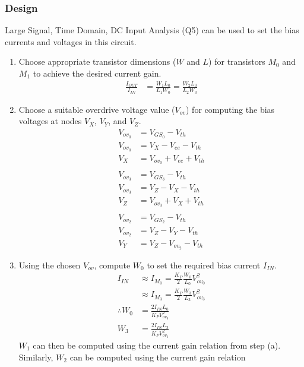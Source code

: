 \subsubsection{Design}
Large Signal, Time Domain, DC Input Analysis (Q5) can be used to set the bias
currents and voltages in this circuit.
\begin{enumerate}
  \item Choose appropriate transistor dimensions
    ($W$ and $L$) for transistors $M_0$ and $M_1$
    to achieve the desired current gain.
    \begin{align*}
      \frac{I_{OUT}}{I_{IN}} &= \frac{W_1 L_0}{L_1 W_0} = \frac{W_2 L_3}{L_2 W_3}
    \end{align*}
  \item Choose a suitable overdrive voltage value
    ($V_{ov}$) for computing the bias voltages at
    nodes $V_{X}$, $V_{Y}$, and $V_{Z}$.
    \begin{align*}
      V_{ov_0} &= V_{GS_0} - V_{th} \\
      V_{ov_0} &= V_{X} - V_{ee} - V_{th} \\
      V_{X} &= V_{ov_0} + V_{ee} + V_{th} \\
      \\
      V_{ov_3} &= V_{GS_3} - V_{th} \\
      V_{ov_3} &= V_{Z} - V_{X} - V_{th} \\
      V_{Z} &= V_{ov_3} + V_{X} + V_{th} \\
      \\
      V_{ov_2} &= V_{GS_2} - V_{th} \\
      V_{ov_2} &= V_{Z} - V_{Y} - V_{th} \\
      V_{Y} &= V_{Z} - V_{ov_2} - V_{th}
    \end{align*}
  \item Using the chosen $V_{ov}$, compute $W_0$
    to set the required bias current $I_{IN}$.
    \begin{align*}
      I_{IN} &\approx I_{M_0} = \frac{K_P}{2} \frac{W_0}{L_0} V_{ov_0}^2 \\
             &\approx I_{M_3} = \frac{K_P}{2} \frac{W_3}{L_3} V_{ov_3}^2 \\
      \therefore W_0 &= \frac{2 I_{IN} L_0}{K_P V_{ov_0}^2} \\
                 W_3 &= \frac{2 I_{IN} L_3}{K_P V_{ov_3}^2}
    \end{align*}
    $W_1$ can then be computed using the current
    gain relation from step (a). Similarly, $W_2$
    can be computed using the current gain relation

\end{enumerate}
